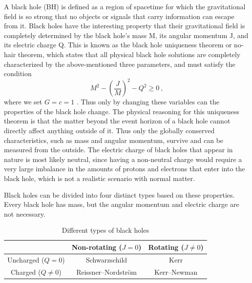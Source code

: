 \documentclass[english, oneside]{HYgradu}
\begin{document}
A black hole (BH) is defined as a region of spacetime for which the gravitational field is so strong that no objects or signals that carry information can escape from it. Black holes have the interesting property that their gravitational field is completely determined by the black hole's mass M, its angular momentum J, and its electric charge Q. This is known as the black hole uniqueness theorem or no-hair theorem, which states that all physical black hole solutions are completely characterized by the above-mentioned three parameters, and must satisfy the condition 
\begin{equation} \label{equ:bhunique}
M^2 - \left( \frac{J}{M} \right)^2 - Q^2 \geq 0 \ ,
\end{equation}
where we set $G = c = 1$ \citep{mazur:2001}.
Thus only by changing these variables can the properties of the black hole change. The physical reasoning for this uniqueness theorem is that the matter beyond the event horizon of a black hole cannot directly affect anything outside of it. Thus only the globally conserved characteristics, such as mass and angular momentum, survive and can be measured from the outside. The electric charge of black holes that appear in nature is most likely neutral, since having a non-neutral charge would require a very large imbalance in the amounts of protons and electrons that enter into the black hole, which is not a realistic scenario with normal matter.

Black holes can be divided into four distinct types based on these properties. Every black hole has mass, but the angular momentum and electric charge are not necessary.
\begin{table}[htb]
\centering
\caption{Different types of black holes}
\begin{tabular}{|c|c|c|}
\hline
 & Non-rotating ($J = 0$) & Rotating ($J \neq 0$) \\ \hline
Uncharged ($Q = 0$) & Schwarzschild & Kerr \\ \hline
Charged ($Q \neq 0$) & Reissner–Nordström & Kerr–Newman \\ \hline
\end{tabular}
\end{table}
\end{document}

